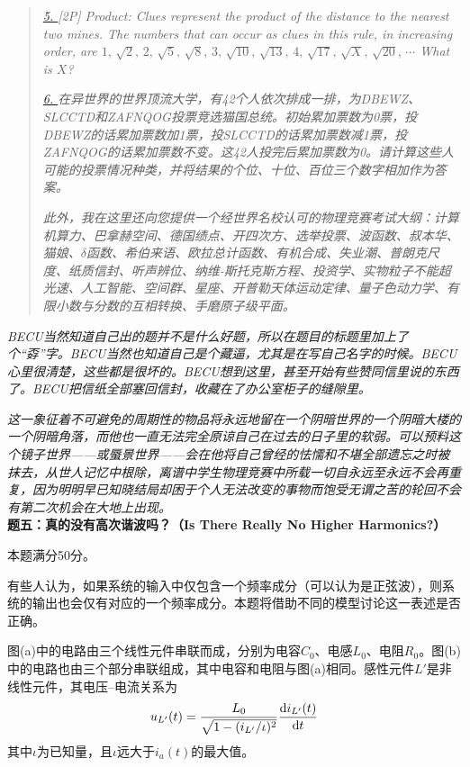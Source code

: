 \documentclass[11pt,a4paper,onecolumn,UTF8]{ctexart}
\begin{document}
\begin{quote}
		\textit{\href{https://steamcommunity.com/sharedfiles/filedetails/?id=3267960843}{5. }[2P] Product: Clues represent the product of the distance to the nearest two mines. The numbers that can occur as clues in this rule, in increasing order, are $1,\,\sqrt{2},\,2,\,\sqrt{5},\,\sqrt{8},\,3,\,\sqrt{10},\,\sqrt{13},\,4,\,\sqrt{17},\,\sqrt{X},\,\sqrt{20},\,\cdots$ What is $X$?}
		
		\textit{\href{https://www.bilibili.com/video/BV1iCD2YoEMN}{6. }在异世界的世界顶流大学，有42个人依次排成一排，为DBEWZ、SLCCTD和ZAFNQOG投票竞选猫国总统。初始累加票数为0票，投DBEWZ的话累加票数加1票，投SLCCTD的话累加票数减1票，投ZAFNQOG的话累加票数不变。这42人投完后累加票数为0。请计算这些人可能的投票情况种类，并将结果的个位、十位、百位三个数字相加作为答案。}
		
		\textit{此外，我在这里还向您提供一个经世界名校认可的物理竞赛考试大纲：计算机算力、巴拿赫空间、德国绩点、开四次方、选举投票、波函数、叔本华、猫娘、$\delta$函数、希伯来语、欧拉总计函数、有机合成、失业潮、普朗克尺度、纸质信封、听声辨位、纳维-斯托克斯方程、投资学、实物粒子不能超光速、人工智能、空间群、星座、开普勒天体运动定律、量子色动力学、有限小数与分数的互相转换、手磨原子级平面。}
		
	\end{quote}
	
	\textit{{\color{white}BECU}当然知道自己出的题并不是什么好题，所以在题目的标题里加上了个“孬”字。{\color{white}BECU}当然也知道自己是个藏逼，尤其是在写自己名字的时候。{\color{white}BECU}心里很清楚，这些都是很坏的。{\color{white}BECU}想到这里，甚至开始有些赞同信里说的东西了。{\color{white}BECU}把信纸全部塞回信封，收藏在了办公室柜子的缝隙里。}
	
	\textit{这一象征着不可避免的周期性的物品将永远地留在一个阴暗世界的一个阴暗大楼的一个阴暗角落，而他也一直无法完全原谅自己在过去的日子里的软弱。可以预料这个镜子世界——或蜃景世界——会在他将自己曾经的怯懦和不堪全部遗忘之时被抹去，从世人记忆中根除，离谱中学生物理竞赛中所载一切自永远至永远不会再重复，因为明明早已知晓结局却困于个人无法改变的事物而饱受无谓之苦的轮回不会有第二次机会在大地上出现。}\\
	
	\noindent
	\textbf{题五：真的没有高次谐波吗？（Is There Really No Higher Harmonics?）}
	
	本题满分50分。
	
	有些人认为，如果系统的输入中仅包含一个频率成分（可以认为是正弦波），则系统的输出也会仅有对应的一个频率成分。本题将借助不同的模型讨论这一表述是否正确。
	
	图(a)中的电路由三个线性元件串联而成，分别为电容$C_0$、电感$L_0$、电阻$R_0$。图(b)中的电路也由三个部分串联组成，其中电容和电阻与图(a)相同。感性元件$L'$是非线性元件，其电压--电流关系为
	\begin{equation*}
		u_{L'}(t)=\frac{L_0}{\sqrt{1-(i_{L'}/\iota)^2}}\frac{\mathrm{d} i_{L'}(t)}{\mathrm{d} t}
	\end{equation*}
	其中$\iota$为已知量，且$\iota$远大于$i_a(t)$的最大值。
	
\end{document}
